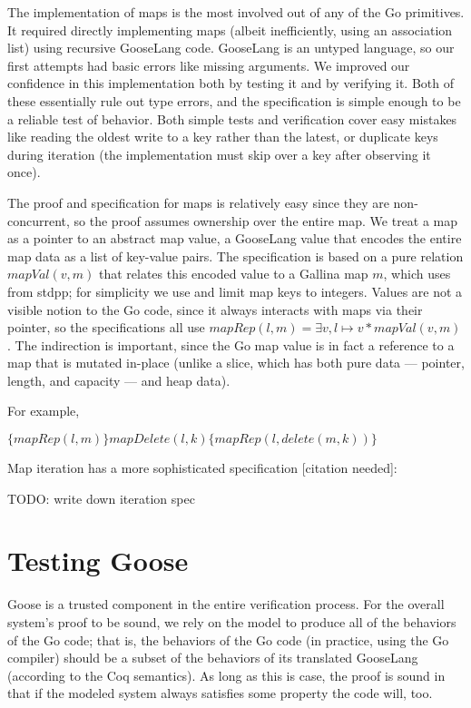 The implementation of maps is the most involved out of any of the Go
primitives. It required directly implementing maps (albeit
inefficiently, using an association list) using recursive GooseLang
code. GooseLang is an untyped language, so our first attempts had basic
errors like missing arguments. We improved our confidence in this
implementation both by testing it and by verifying it. Both of these
essentially rule out type errors, and the specification is simple enough
to be a reliable test of behavior. Both simple tests and verification
cover easy mistakes like reading the oldest write to a key rather than
the latest, or duplicate keys during iteration (the implementation must
skip over a key after observing it once).

The proof and specification for maps is relatively easy since they are
non-concurrent, so the proof assumes ownership over the entire map. We
treat a map as a pointer to an abstract map value, a GooseLang value
that encodes the entire map data as a list of key-value pairs. The
specification is based on a pure relation $mapVal(v, m)$ that relates
this encoded value to a Gallina map $m$, which uses  from
stdpp; for simplicity we use  and limit map
keys to integers. Values are not a visible notion to the Go code, since
it always interacts with maps via their pointer, so the specifications
all use $mapRep(l, m) = \exists v, l \mapsto v * mapVal(v, m)$. The
indirection is important, since the Go map value
 is in fact a reference to a map that is
mutated in-place (unlike a slice, which has both pure data --- pointer,
length, and capacity --- and heap data).

For example,

$\{mapRep(l, m)\} mapDelete(l, k) \{mapRep(l, delete(m, k))\}$

Map iteration has a more sophisticated specification [citation
needed]:

TODO: write down iteration spec

\section{Testing Goose}

Goose is a trusted component in the entire verification process. For the
overall system's proof to be sound, we rely on the model to produce all
of the behaviors of the Go code; that is, the behaviors of the Go code
(in practice, using the Go compiler) should be a subset of the behaviors
of its translated GooseLang (according to the Coq semantics). As long as
this is case, the proof is sound in that if the modeled system always
satisfies some property the code will, too.

